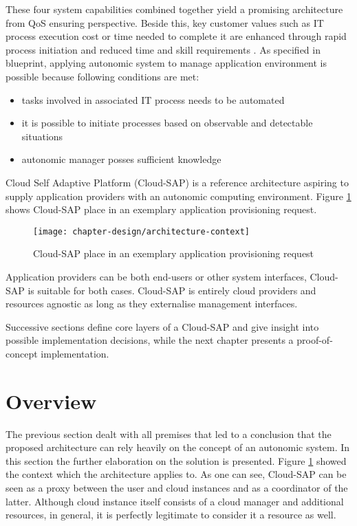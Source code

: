 These four system capabilities combined together yield a promising architecture from QoS ensuring perspective. Beside this, key customer values such as IT process execution cost or time needed to complete it are enhanced through rapid process initiation and reduced time and skill requirements \cite{IBM06}. As specified in blueprint, applying autonomic system to manage application environment is possible because following conditions are met:
\begin{itemize}
  \item tasks involved in associated IT process needs to be automated
  \item it is possible to initiate processes based on observable and detectable situations
  \item autonomic manager posses sufficient knowledge
\end{itemize}

Cloud Self Adaptive Platform (Cloud-SAP) is a reference architecture aspiring to supply application providers with an autonomic computing environment. Figure \ref{img:architecture-context} shows Cloud-SAP place in an exemplary application provisioning request. 
\begin{figure}[!ht]
  \begin{center}
    \texttt{[image: chapter-design/architecture-context]}
  \end{center}
  \caption{Cloud-SAP place in an exemplary application provisioning request}
  \label{img:architecture-context}
\end{figure}

Application providers can be both end-users or other system interfaces, Cloud-SAP is suitable for both cases. Cloud-SAP is entirely cloud providers and resources agnostic as long as they externalise management interfaces.

Successive sections define core layers of a Cloud-SAP and give insight into possible implementation decisions, while the next chapter presents a proof-of-concept implementation.

\section{Overview}
The previous section dealt with all premises that led to a conclusion that the proposed architecture can rely heavily on the concept of an autonomic system. In this section the further elaboration on the solution is presented.
Figure \ref{img:architecture-context} showed the context which the architecture applies to. As one can see, Cloud-SAP can be seen as a proxy between the user and cloud instances and as a coordinator of the latter. Although cloud instance itself consists of a cloud manager and additional resources, in general, it is perfectly legitimate to consider it a resource as well. 

